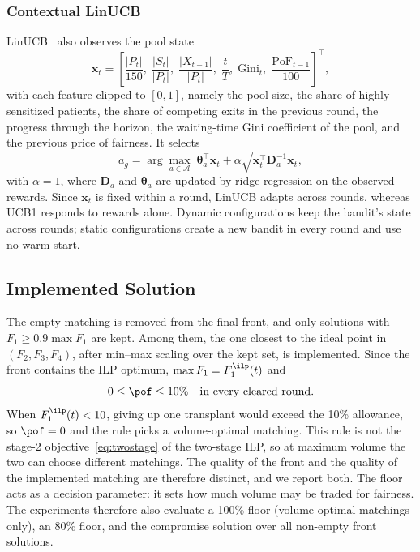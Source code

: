\documentclass[journal]{IEEEtran}
\begin{document}
\subsubsection{Contextual LinUCB}
LinUCB~\cite{li2010contextual} also observes the pool state
\begin{equation}
  \mathbf{x}_t = \left[\frac{|P_t|}{150},\;
  \frac{|S_t|}{|P_t|},\;
  \frac{|X_{t-1}|}{|P_t|},\;
  \frac{t}{T},\;
  \mathrm{Gini}_t,\;
  \frac{\mathrm{PoF}_{t-1}}{100}\right]^{\top}  ,
  \label{eq:context}
\end{equation}
with each feature clipped to $[0,1]$, namely the pool size, the share of highly sensitized patients, the
share of competing exits in the previous round, the progress through
the horizon, the waiting-time Gini coefficient of the pool, and the
previous price of fairness. It selects
\begin{equation}
  a_g = \arg\max_{a \in \mathcal{A}} \;
        \boldsymbol{\theta}_a^{\top} \mathbf{x}_t
        + \alpha \sqrt{\mathbf{x}_t^{\top} \mathbf{D}_a^{-1} \mathbf{x}_t} ,
  \label{eq:linucb}
\end{equation}
with $\alpha = 1$, where $\mathbf{D}_a$ and $\boldsymbol{\theta}_a$ are
updated by ridge regression on the observed rewards. Since
$\mathbf{x}_t$ is fixed within a round, LinUCB adapts across rounds,
whereas UCB1 responds to rewards alone. Dynamic configurations keep the
bandit's state across rounds; static configurations create a new bandit
in every round and use no warm start.

\subsection{Implemented Solution}
\label{sec:method:select}

The empty matching is removed from the final front, and only solutions
with $F_1 \geq 0.9 \max F_1$ are kept. Among them, the one closest to
the ideal point in $(F_2, F_3, F_4)$, after min--max scaling over the
kept set, is implemented. Since the front contains the ILP optimum,
$\max F_1 = F_1^{\ilp}(t)$ and
\begin{equation}
  0 \leq \pof \leq 10\% \quad \text{in every cleared round.}
  \label{eq:pofbound}
\end{equation}
When $F_1^{\ilp}(t) < 10$, giving up one transplant would exceed the
10\% allowance, so $\pof = 0$ and the rule picks a volume-optimal
matching. This rule is not the stage-2 objective~\eqref{eq:twostage} of
the two-stage ILP, so at maximum volume the two can choose different
matchings. The quality of the front and the quality of the implemented
matching are therefore distinct, and we report both. The floor acts as a decision parameter: it sets how much
volume may be traded for fairness. The experiments therefore also
evaluate a 100\% floor (volume-optimal matchings only), an 80\% floor,
and the compromise solution over all non-empty front solutions.
\end{document}
